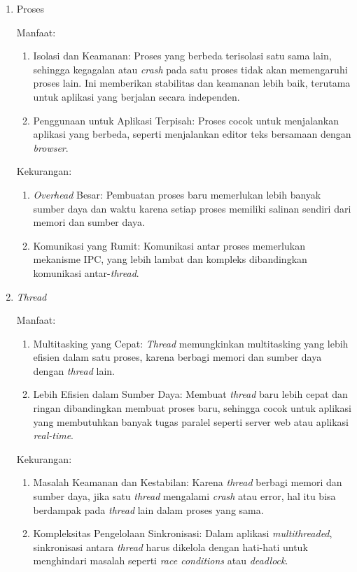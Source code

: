 \documentclass[12pt]{article}
\begin{document}
      \begin{enumerate}
	      \item Proses

	            Manfaat:
	            \begin{enumerate}
		            \item Isolasi dan Keamanan: Proses yang berbeda terisolasi satu sama lain, sehingga kegagalan atau \textit{crash} pada satu proses tidak akan memengaruhi proses lain. Ini memberikan stabilitas dan keamanan lebih baik, terutama untuk aplikasi yang berjalan secara independen.
		            \item Penggunaan untuk Aplikasi Terpisah: Proses cocok untuk menjalankan aplikasi yang berbeda, seperti menjalankan editor teks bersamaan dengan \textit{browser}.
	            \end{enumerate}
	            Kekurangan:
	            \begin{enumerate}
		            \item \textit{Overhead} Besar: Pembuatan proses baru memerlukan lebih banyak sumber daya dan waktu karena setiap proses memiliki salinan sendiri dari memori dan sumber daya.
		            \item Komunikasi yang Rumit: Komunikasi antar proses memerlukan mekanisme IPC, yang lebih lambat dan kompleks dibandingkan komunikasi antar-\textit{thread}.
	            \end{enumerate}
	      \item \textit{Thread}

	            Manfaat:
	            \begin{enumerate}
		            \item Multitasking yang Cepat: \textit{Thread} memungkinkan multitasking yang lebih efisien dalam satu proses, karena berbagi memori dan sumber daya dengan \textit{thread} lain.
		            \item Lebih Efisien dalam Sumber Daya: Membuat \textit{thread} baru lebih cepat dan ringan dibandingkan membuat proses baru, sehingga cocok untuk aplikasi yang membutuhkan banyak tugas paralel seperti server web atau aplikasi \textit{real-time}.
	            \end{enumerate}

	            Kekurangan:
	            \begin{enumerate}
		            \item Masalah Keamanan dan Kestabilan: Karena \textit{thread} berbagi memori dan sumber daya, jika satu \textit{thread} mengalami \textit{crash} atau error, hal itu bisa berdampak pada \textit{thread} lain dalam proses yang sama.
		            \item Kompleksitas Pengelolaan Sinkronisasi: Dalam aplikasi \textit{multithreaded}, sinkronisasi antara \textit{thread} harus dikelola dengan hati-hati untuk menghindari masalah seperti \textit{race conditions} atau \textit{deadlock}.
	            \end{enumerate}
      \end{enumerate}
\end{document}
